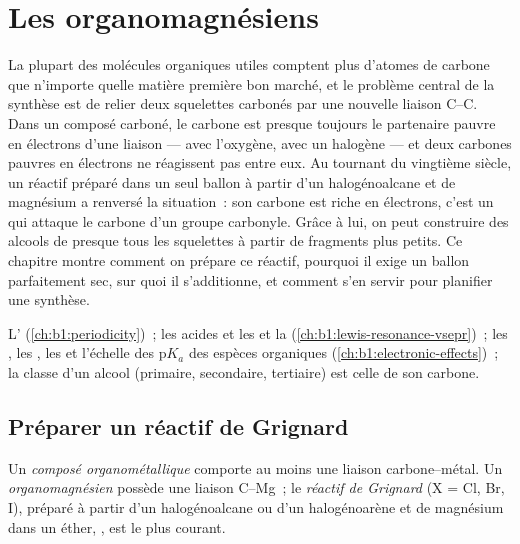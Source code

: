 \chapter{Les organomagnésiens}\label{ch:b1:organomagnesium}

La plupart des molécules organiques utiles comptent plus d'atomes de
carbone que n'importe quelle matière première bon marché, et le problème
central de la synthèse est de relier deux squelettes carbonés par une
nouvelle liaison C--C. Dans un composé carboné, le carbone est presque
toujours le partenaire pauvre en électrons d'une liaison --- avec
l'oxygène, avec un halogène --- et deux carbones pauvres en électrons ne
réagissent pas entre eux. Au tournant du vingtième siècle, un réactif
préparé dans un seul ballon à partir d'un halogénoalcane et de magnésium
a renversé la situation~: son carbone est riche en électrons, c'est un
 qui attaque le carbone d'un groupe carbonyle. Grâce à lui,
on peut construire des alcools de presque tous les squelettes à partir
de fragments plus petits. Ce chapitre montre comment on prépare ce
réactif, pourquoi il exige un ballon parfaitement sec, sur quoi il
s'additionne, et comment s'en servir pour planifier une synthèse.

\begin{recall}
L' (\cref{ch:b1:periodicity})~; les acides et les  et la  (\cref{ch:b1:lewis-resonance-vsepr})~; les
, les , les  et l'échelle des
$\mathrm{p}K_a$ des espèces organiques (\cref{ch:b1:electronic-effects})~;
la classe d'un alcool (primaire, secondaire, tertiaire) est celle de son
carbone.
\end{recall}

\section{Préparer un réactif de Grignard}

\begin{definition}\label{def:b1:organomagnesium:organometallic}
Un \emph{composé organométallique} comporte au moins
une liaison carbone--métal. Un \emph{organomagnésien}
possède une liaison C--Mg~; le \emph{réactif de
Grignard}  (X = Cl, Br, I), préparé à partir d'un
halogénoalcane ou d'un halogénoarène et de magnésium dans un éther,
, est le plus courant.
\end{definition}

